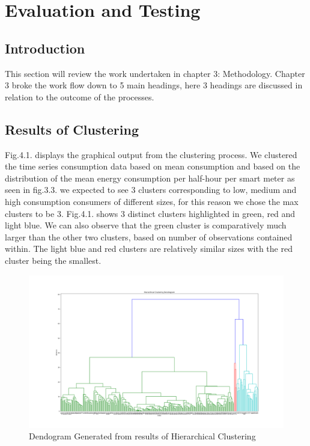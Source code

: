 \chapter{Evaluation and Testing}
\section{Introduction}
This section will review the work undertaken in chapter 3: Methodology. Chapter 3 broke the work flow down to 5 main headings, here 3 headings are discussed in relation to the outcome of the processes.

\section{Results of Clustering}
Fig.4.1. displays the graphical output from the clustering process. We clustered the time series consumption data based on mean consumption and based on the distribution of the mean energy consumption per half-hour per smart meter as seen in fig.3.3. we expected to see 3 clusters corresponding to low, medium and high consumption consumers of different sizes, for this reason we chose the max clusters to be 3. Fig.4.1. shows 3 distinct clusters highlighted in green, red and light blue. We can also observe that the green cluster is comparatively much larger than the other two clusters, based on number of observations contained within. The light blue and red clusters are relatively similar sizes with the red cluster being the smallest.

\begin{figure}
\centering     
\includegraphics[width=1.7\textwidth, angle=90]{Figures/results/diagram.png}
\caption{Dendogram Generated from results of Hierarchical Clustering}
\label{fig:Dendrogram}
\end{figure} 

